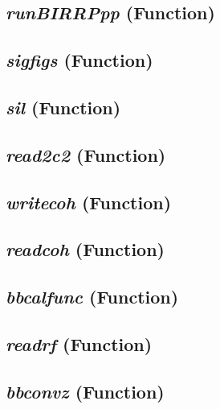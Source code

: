\subsection{\textit{runBIRRPpp} (Function)}
\label{ssec:processing.birrptools.runBIRRPpp}

\subsection{\textit{sigfigs} (Function)}
\label{ssec:processing.birrptools.sigfigs}

\subsection{\textit{sil} (Function)}
\label{ssec:processing.birrptools.sil}

\subsection{\textit{read2c2} (Function)}
\label{ssec:processing.birrptools.read2c2}



\subsection{\textit{writecoh} (Function)}
\label{ssec:processing.birrptools.writecoh}

\subsection{\textit{readcoh} (Function)}
\label{ssec:processing.birrptools.readcoh}



\subsection{\textit{bbcalfunc} (Function)}
\label{ssec:processing.birrptools.readj}

\subsection{\textit{readrf} (Function)}
\label{ssec:processing.birrptools.readrf}

\subsection{\textit{bbconvz} (Function)}
\label{ssec:processing.birrptools.bbconvz}

